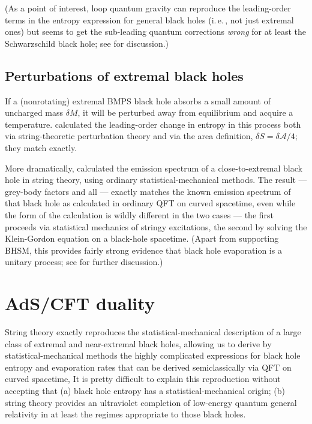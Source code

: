 \documentclass{article}
\newcommand{\iec}{\mbox{i.\,e.\,}}
\newcommand{\mc}[1]{\ensuremath{\mathcal{#1}}}
\begin{document}
(As a point of interest, loop quantum gravity can reproduce the leading-order terms in the entropy expression for general black holes (\iec, not just extremal ones) but seems to get the sub-leading quantum corrections \emph{wrong} for at least the Schwarzschild black hole; see  for discussion.)

\subsection{Perturbations of extremal black holes}\label{string-nonextremal}

If a (nonrotating) extremal BMPS black hole absorbs a small amount of uncharged mass $\delta M$, it will be perturbed away from equilibrium and acquire a temperature.  calculated the leading-order change in entropy in this process both via string-theoretic perturbation theory and via the area definition, $\delta S = \delta \mc{A}/4$; they match exactly. 

More dramatically,  calculated the emission spectrum of a close-to-extremal black hole in string theory, using ordinary statistical-mechanical methods. The result --- grey-body factors and all --- exactly matches the known emission spectrum of that black hole as calculated in ordinary QFT on curved spacetime, even while the form of the calculation is wildly different in the two cases --- the first proceeds via statistical mechanics of stringy excitations, the second by solving the Klein-Gordon equation on a black-hole spacetime. (Apart from supporting BHSM, this provides fairly strong evidence that black hole evaporation is a unitary process; see  for further discussion.)

\section{AdS/CFT duality}\label{adscft}

String theory exactly reproduces the statistical-mechanical description of a large class of extremal and near-extremal black holes, allowing us to derive by statistical-mechanical methods the highly complicated expressions for black hole entropy and evaporation rates that can be derived semiclassically via QFT on curved spacetime, It is pretty difficult to explain this reproduction without accepting that (a) black hole entropy has a statistical-mechanical origin; (b) string theory provides an ultraviolet completion of low-energy quantum general relativity in at least the regimes appropriate to those black holes.
\end{document}
